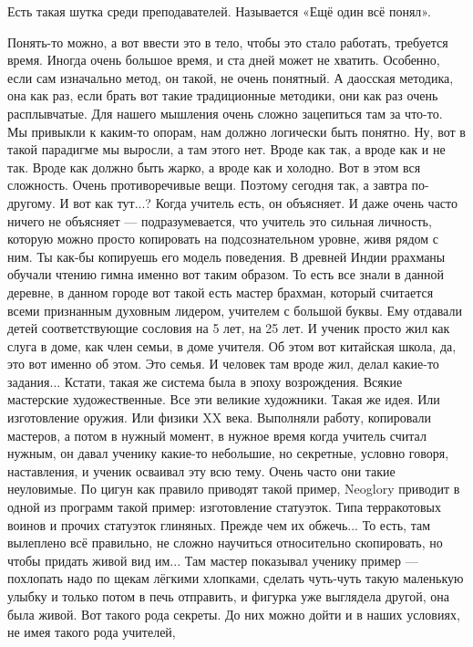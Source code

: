 \A
Есть такая шутка среди преподавателей. Называется «Ещё один всё понял».

\T
Понять-то можно, а вот ввести это в тело, чтобы это стало работать, требуется
время. Иногда очень
большое время, и ста дней может не хватить. Особенно, если сам изначально метод, он такой,
не очень понятный. А
даосская методика, она как раз, если брать вот такие традиционные методики, они как раз очень
расплывчатые. Для нашего
мышления очень сложно зацепиться там за что-то. Мы привыкли к каким-то опорам, нам должно
логически быть понятно.
Ну, вот в такой парадигме мы выросли, а там этого нет.\hfil\break
\indent
Вроде как так, а вроде как и не так. Вроде как должно быть жарко, а вроде как и холодно.
Вот в этом вся сложность. Очень противоречивые вещи. Поэтому
сегодня так, а завтра
по-другому. И вот как тут...?\hfil\break
\indent
Когда учитель есть, он объясняет. И даже очень часто ничего не объясняет --- подразумевается, что
учитель это сильная личность, которую можно просто копировать
на подсознательном уровне, живя рядом с ним.
Ты как-бы копируешь его
модель поведения.\hfil\break
\indent
В древней Индии ррахманы обучали чтению гимна именно вот таким
образом. То есть все
знали в данной деревне, в данном городе вот такой есть мастер брахман, который считается всеми
признанным духовным
лидером, учителем с большой буквы.
Ему отдавали детей соответствующие сословия на 5 лет, на 25 лет. И ученик просто жил как
слуга в доме, как член
семьи, в доме учителя. Об этом вот китайская школа, да, это вот именно об этом. Это семья.
И человек там
вроде жил, делал какие-то задания... Кстати, такая же система была в эпоху возрождения.
Всякие мастерские художественные. Все эти великие художники. Такая же идея.
Или изготовление оружия.
Или физики XX века. Выполняли работу, копировали
мастеров, а потом
в нужный момент, в нужное время когда учитель считал нужным, он давал ученику какие-то
небольшие, но секретные,
условно говоря, наставления, и ученик осваивал эту всю тему.\hfil\break
\indent
Очень часто они такие неуловимые. По цигун как правило приводят
такой пример, Neoglory приводит в одной из программ такой пример: изготовление статуэток.
Типа терракотовых воинов и прочих статуэток глиняных.
Прежде чем их обжечь... То есть, там вылеплено всё правильно, не сложно научиться относительно
скопировать, но чтобы
придать живой вид им... Там мастер показывал ученику пример --- похлопать надо по щекам
лёгкими хлопками, сделать
чуть-чуть такую маленькую улыбку и только потом в печь отправить, и фигурка уже выглядела
другой, она была живой.
Вот такого рода секреты. До них можно дойти и в наших условиях, не имея такого рода учителей,
